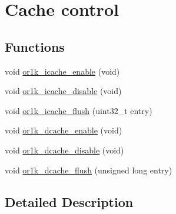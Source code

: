 \hypertarget{group__or1k__cache}{\section{Cache control}
\label{group__or1k__cache}
}
\subsection*{Functions}
\begin{DoxyCompactItemize}
\item 
void \hyperlink{group__or1k__cache_gaff5c592333bea4c2cbba843b32b2adee}{or1k\-\_\-icache\-\_\-enable} (void)
\item 
void \hyperlink{group__or1k__cache_ga3a5118c6cfcdd82b84fcd04c31f8427e}{or1k\-\_\-icache\-\_\-disable} (void)
\item 
void \hyperlink{group__or1k__cache_ga58d7af12dd1880042ac8b89dca531ab8}{or1k\-\_\-icache\-\_\-flush} (uint32\-\_\-t entry)
\item 
void \hyperlink{group__or1k__cache_gab29831e036f48d6f03b26ff6956af0ab}{or1k\-\_\-dcache\-\_\-enable} (void)
\item 
void \hyperlink{group__or1k__cache_gacad2723e895ed222d2214e778f3c921e}{or1k\-\_\-dcache\-\_\-disable} (void)
\item 
void \hyperlink{group__or1k__cache_ga714e68f1211a34210801ca98987fcf3b}{or1k\-\_\-dcache\-\_\-flush} (unsigned long entry)
\end{DoxyCompactItemize}


\subsection{Detailed Description}


